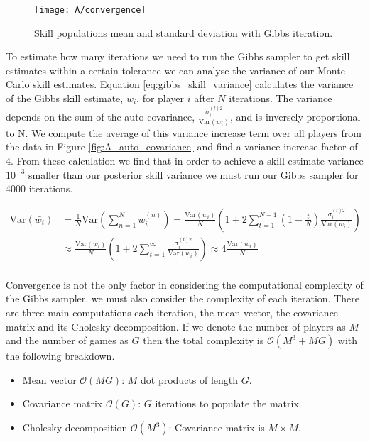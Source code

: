 \documentclass[11pt]{article}
\begin{document}
\begin{figure}[h]
    \centering
    \texttt{[image: A/convergence]} 
    \caption{Skill populations mean and standard deviation with Gibbs iteration.}
    \label{fig:A_convergence}
\end{figure}

To estimate how many iterations we need to run the Gibbs sampler to get skill estimates within a certain tolerance we can analyse the variance of our Monte Carlo skill estimates. Equation \ref{eq:gibbs_skill_variance} calculates the variance of the Gibbs skill estimate, $\bar{w_i}$, for player $i$ after $N$ iterations. The variance depends on the sum of the auto covariance, $\frac{\sigma_i^{(t)2}}{\text{Var}(w_i)}$, and is inversely proportional to N. We compute the average of this variance increase term over all players from the data in Figure \ref{fig:A_auto_covariance} and find a variance increase factor of 4. From these calculation we find that in order to achieve a skill estimate variance $10^{-3}$ smaller than our posterior skill variance we must run our Gibbs sampler for 4000 iterations.

\begin{equation}
    \begin{split}
    \text{Var}(\bar{w_i}) &= \frac{1}{N} \text{Var}(\sum_{n=1}^{N} w_i^{(n)}) = \frac{\text{Var}(w_i)}{N} (1 + 2 \sum_{t=1}^{N-1} (1-\frac{t}{N}) \frac{\sigma_i^{(t)2}}{\text{Var}(w_i)}) \\
     &\approx \frac{\text{Var}(w_i)}{N} (1 + 2 \sum_{t=1}^{\infty} \frac{\sigma_i^{(t)2}}{\text{Var}(w_i)}) \approx 4\frac{\text{Var}(w_i)}{N}\\
    \end{split}
    \label{eq:gibbs_skill_variance}
\end{equation}

Convergence is not the only factor in considering the computational complexity of the Gibbs sampler, we must also consider the complexity of each iteration. There are three main computations each iteration, the mean vector, the covariance matrix and its Cholesky decomposition. If we denote the number of players as $M$ and the number of games as $G$ then the total complexity is $\mathcal{O}(M^3 + MG)$ with the following breakdown.

\begin{itemize}
    \itemsep0em 
    \item Mean vector $\mathcal{O}(MG)$: $M$ dot products of length $G$.
    \item Covariance matrix $\mathcal{O}(G)$: $G$ iterations to populate the matrix.
    \item Cholesky decomposition $\mathcal{O}(M^3)$: Covariance matrix is $M \times M$.
\end{itemize}
\end{document}
